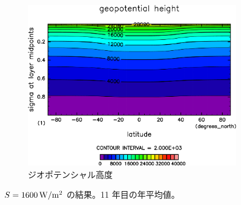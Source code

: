 \documentclass[body]{subfiles}
\begin{document}
\begin{figure}[t]
\begin{subfigure}{.4\textwidth}
		\includegraphics[width=\columnwidth]{S1600/Height,time=3650:4015-crop-rotate.pdf}
		\caption{ジオポテンシャル高度}
	\end{subfigure}
	\caption{
		\(S=1600\hmu{W/m^2}\) の結果。11 年目の年平均値。
	}\label{S1600}
\end{figure}
\end{document}
